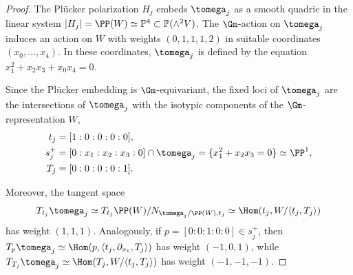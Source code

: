 \begin{proof}
The Plücker polarization $H_j$ embeds $\tomega_j$ as a smooth quadric in the linear system $|H_j| = \PP(W) \simeq \mathbb{P}^4 \subset \mathbb{P}(\wedge^2 V)$. The $\Gm$\nobreakdash-action on $\tomega_j$ induces an action on $W$ with weights $(0,1,1,1,2)$ in suitable coordinates $(x_0,\ldots,x_4)$. In these coordinates, $\tomega_j$ is defined by the equation $x_1^2+x_2x_3+x_0x_4=0$.

Since the Plücker embedding is $\Gm$\nobreakdash-equivariant, the fixed loci of $\tomega_j$ are the intersections of $\tomega_j$ with the isotypic components of the $\Gm$\nobreakdash-representation $W$, \ie
\begin{align*}
t_j & =[1:0:0:0:0],\\
s_j^+& = [0:x_1:x_2:x_3:0] \cap \tomega_j = \{x_1^2+x_2x_3 =0\}\simeq \PP^1,\\
T_j & = [0:0:0:0:1].
\end{align*}

Moreover, the tangent space
\[
T_{t_j}\tomega_j \simeq T_{t_j}\PP(W)/N_{\tomega_j/\PP(W), t_j} \simeq \Hom(t_j, W/\langle t_j, T_j\rangle)
\]
has weight $(1,1,1)$. Analogously, if $p = [0:0:1:0:0] \in s^{+}_j$, then
$
T_{p}\tomega_j \simeq \Hom(p, \langle t_j, \partial_{x_1}, T_j\rangle)
$
has weight $(-1,0,1)$, while $T_{T_j}\tomega_j \simeq \Hom(T_j, W/\langle t_j, T_j\rangle)$ has weight $(-1,-1,-1)$.
\end{proof}

